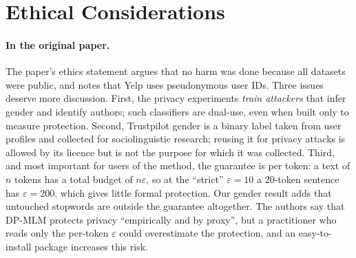 \documentclass[11pt]{article}
\begin{document}
\section{Ethical Considerations}
\label{sec:ethics}
\paragraph{In the original paper.} The paper's ethics statement argues that no harm was done because all datasets were public, and notes that Yelp uses pseudonymous user IDs. Three issues deserve more discussion. First, the privacy experiments \emph{train attackers} that infer gender and identify authors; such classifiers are dual-use, even when built only to measure protection. Second, Trustpilot gender is a binary label taken from user profiles and collected for sociolinguistic research; reusing it for privacy attacks is allowed by its licence but is not the purpose for which it was collected. Third, and most important for users of the method, the guarantee is per token: a text of $n$ tokens has a total budget of $n\varepsilon$, so at the ``strict'' $\varepsilon=10$ a 20-token sentence has $\varepsilon=200$, which gives little formal protection. Our gender result adds that untouched stopwords are outside the guarantee altogether. The authors say that DP-MLM protects privacy ``empirically and by proxy'', but a practitioner who reads only the per-token $\varepsilon$ could overestimate the protection, and an easy-to-install package increases this risk.
\end{document}
